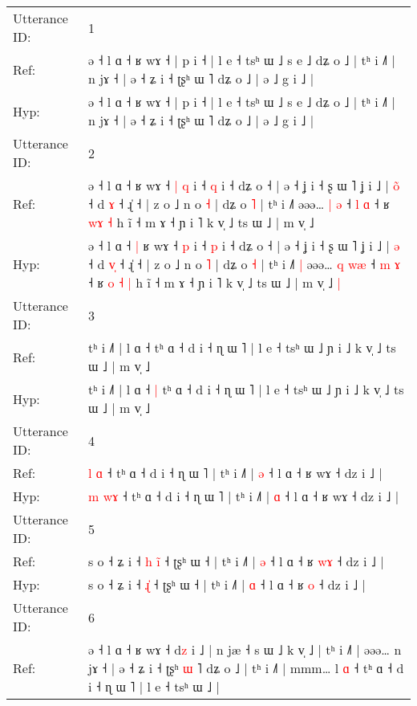 \documentclass[10pt]{article}
\DeclareRobustCommand{\hl}[1]{{\textcolor{red}{#1}}}
\begin{document}
\begin{longtable}{ll}
\toprule
Utterance ID: & 1 \\
Ref: & ə ˧ l ɑ ˧ ʁ wɤ ˧ | p i ˧ | l e ˧ tsʰ ɯ ˩ s e ˩ dʑ o ˩ | tʰ i ˩˥ | n jɤ ˧ | ə ˧ ʑ i ˧ ʈʂʰ ɯ ˥ dʑ o ˩ | ə ˩ g i ˩ |
 \\
Hyp: & ə ˧ l ɑ ˧ ʁ wɤ ˧ | p i ˧ | l e ˧ tsʰ ɯ ˩ s e ˩ dʑ o ˩ | tʰ i ˩˥ | n jɤ ˧ | ə ˧ ʑ i ˧ ʈʂʰ ɯ ˥ dʑ o ˩ | ə ˩ g i ˩ |
 \\
\midrule
Utterance ID: & 2 \\
Ref: & ə ˧ l ɑ ˧\hl{}\hl{} ʁ wɤ ˧\hl{ }\hl{|} \hl{q} i ˧ \hl{q} i ˧ dʑ o ˧ | ə ˧ ʝ i ˧ ʂ ɯ ˥ ʝ i ˩ | \hl{o}\hl{̃} ˧ d \hl{}\hl{ɤ} ˧ ɻ̍ ˧ | z o ˩ n o \hl{˧} | dʑ o \hl{˥} | tʰ i ˩˥\hl{}\hl{} əəə… \hl{|} \hl{}\hl{ə} ˧ \hl{l} \hl{ɑ} ˧ ʁ \hl{}\hl{w}\hl{ɤ} \hl{˧} h ĩ ˧ m ɤ ˧ ɲ i ˥ k v̩ ˩ ts ɯ ˩ | m v̩ ˩\hl{}\hl{}
 \\
Hyp: & ə ˧ l ɑ ˧\hl{ }\hl{|} ʁ wɤ ˧\hl{}\hl{} \hl{p} i ˧ \hl{p} i ˧ dʑ o ˧ | ə ˧ ʝ i ˧ ʂ ɯ ˥ ʝ i ˩ | \hl{}\hl{ə} ˧ d \hl{v}\hl{̩} ˧ ɻ̍ ˧ | z o ˩ n o \hl{˥} | dʑ o \hl{˧} | tʰ i ˩˥\hl{ }\hl{|} əəə… \hl{q} \hl{w}\hl{æ} ˧ \hl{m} \hl{ɤ} ˧ ʁ \hl{o}\hl{ }\hl{˧} \hl{|} h ĩ ˧ m ɤ ˧ ɲ i ˥ k v̩ ˩ ts ɯ ˩ | m v̩ ˩\hl{ }\hl{|}
 \\
\midrule
Utterance ID: & 3 \\
Ref: & tʰ i ˩˥ | l ɑ ˧\hl{}\hl{} tʰ ɑ ˧ d i ˧ ɳ ɯ ˥ | l e ˧ tsʰ ɯ ˩ ɲ i ˩ k v̩ ˩ ts ɯ ˩ | m v̩ ˩
 \\
Hyp: & tʰ i ˩˥ | l ɑ ˧\hl{ }\hl{|} tʰ ɑ ˧ d i ˧ ɳ ɯ ˥ | l e ˧ tsʰ ɯ ˩ ɲ i ˩ k v̩ ˩ ts ɯ ˩ | m v̩ ˩
 \\
\midrule
Utterance ID: & 4 \\
Ref: & \hl{l} \hl{}\hl{ɑ} ˧ tʰ ɑ ˧ d i ˧ ɳ ɯ ˥ | tʰ i ˩˥ | \hl{ə} ˧ l ɑ ˧ ʁ wɤ ˧ dz i ˩ |
 \\
Hyp: & \hl{m} \hl{w}\hl{ɤ} ˧ tʰ ɑ ˧ d i ˧ ɳ ɯ ˥ | tʰ i ˩˥ | \hl{ɑ} ˧ l ɑ ˧ ʁ wɤ ˧ dz i ˩ |
 \\
\midrule
Utterance ID: & 5 \\
Ref: & s o ˧ ʑ i ˧\hl{ }\hl{h} \hl{i}\hl{̃} ˧ ʈʂʰ ɯ ˧ | tʰ i ˩˥ | \hl{ə} ˧ l ɑ ˧ ʁ \hl{w}\hl{ɤ} ˧ dz i ˩ |
 \\
Hyp: & s o ˧ ʑ i ˧\hl{}\hl{} \hl{ɻ}\hl{̍} ˧ ʈʂʰ ɯ ˧ | tʰ i ˩˥ | \hl{ɑ} ˧ l ɑ ˧ ʁ \hl{}\hl{o} ˧ dz i ˩ |
 \\
\midrule
Utterance ID: & 6 \\
Ref: & ə ˧ l ɑ ˧\hl{}\hl{} ʁ wɤ ˧ d\hl{z} i ˩ | n jæ ˧ s ɯ ˩ k v̩ ˩ | tʰ i ˩˥ | əəə… n jɤ ˧ | ə ˧ ʑ i ˧ ʈʂʰ \hl{ɯ} ˥ dʑ o ˩ | tʰ i ˩˥ | mmm… l \hl{}\hl{ɑ} ˧\hl{}\hl{} tʰ ɑ ˧ d i ˧ ɳ ɯ ˥ | l e ˧ tsʰ ɯ ˩ |
 \\

\end{longtable}
\end{document}
